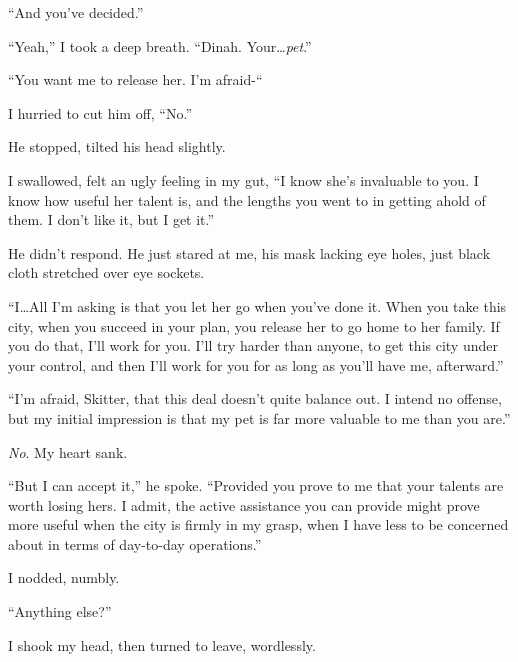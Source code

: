 ``And you've decided.''



``Yeah,'' I took a deep breath.  ``Dinah.  Your\ldots \emph{pet}.''



``You want me to release her.  I'm afraid-``



I hurried to cut him off, ``No.''



He stopped, tilted his head slightly.



I swallowed, felt an ugly feeling in my gut, ``I know she's invaluable to you.  I know how useful her talent is, and the lengths you went to in getting ahold of them.  I don't like it, but I get it.''



He didn't respond.  He just stared at me, his mask lacking eye holes, just black cloth stretched over eye sockets.



``I\ldots All I'm asking is that you let her go when you've done it.  When you take this city, when you succeed in your plan, you release her to go home to her family.  If you do that, I'll work for you.  I'll try harder than anyone, to get this city under your control, and then I'll work for you for as long as you'll have me, afterward.''



``I'm afraid, Skitter, that this deal doesn't quite balance out.  I intend no offense, but my initial impression is that my pet is far more valuable to me than you are.''



\emph{No}.  My heart sank.



``But I can accept it,'' he spoke.  ``Provided you prove to me that your talents are worth losing hers.  I admit, the active assistance you can provide might prove more useful when the city is firmly in my grasp, when I have less to be concerned about in terms of day-to-day operations.''



I nodded, numbly.



``Anything else?''



I shook my head, then turned to leave, wordlessly.



